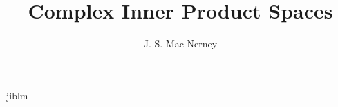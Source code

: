  {jiblm}





\newcommand{\abs}[1]{\left|#1\right|}
\newcommand{\norm}[1]{\left\|#1\right\|}
\newcommand{\p}[1]{\left(#1\right)}
\newcommand{\tail}[1]{#1^{\p{N}}}
\newcommand{\trunk}[1]{#1^{\left[N\right]}}
\newcommand{\lqu}[1]{\textquoteleft#1}
\newcommand{\lquu}[1]{\textquotedblleft#1}
\newcommand{\nl}{\newline}
\newcommand{\np}{\newpage}
\newcommand{\x}{\times}
\newcommand{\bs}{\textbf{S}}
\newcommand{\spr}{S^{\prime}}
\newcommand{\om}{\omega}
\newcommand{\Om}{\Omega}
\newcommand{\ul}{\underline}
\newcommand{\sumin}[2]{\sum_{#1\text{~in~}#2}}
\newcommand{\svert}{S\hspace{-4pt}\vert}
\newcommand{\cvert}{C\hspace{-5pt}\vert}




%
%
%
%
\title{Complex Inner Product Spaces}
\author{J. S. Mac Nerney}
\maketitle
\thispagestyle{empty}

